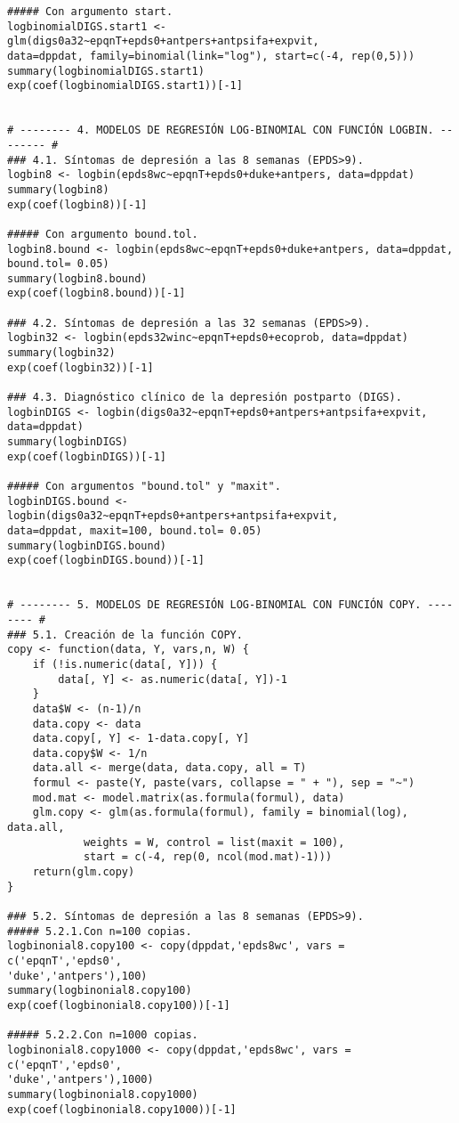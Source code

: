 \begin{Verbatim}
##### Con argumento start.
logbinomialDIGS.start1 <- glm(digs0a32~epqnT+epds0+antpers+antpsifa+expvit, 
data=dppdat, family=binomial(link="log"), start=c(-4, rep(0,5)))
summary(logbinomialDIGS.start1)
exp(coef(logbinomialDIGS.start1))[-1]


# -------- 4. MODELOS DE REGRESIÓN LOG-BINOMIAL CON FUNCIÓN LOGBIN. -------- #
### 4.1. Síntomas de depresión a las 8 semanas (EPDS>9).
logbin8 <- logbin(epds8wc~epqnT+epds0+duke+antpers, data=dppdat)
summary(logbin8)
exp(coef(logbin8))[-1]

##### Con argumento bound.tol.
logbin8.bound <- logbin(epds8wc~epqnT+epds0+duke+antpers, data=dppdat, 
bound.tol= 0.05)
summary(logbin8.bound)
exp(coef(logbin8.bound))[-1]

### 4.2. Síntomas de depresión a las 32 semanas (EPDS>9).
logbin32 <- logbin(epds32winc~epqnT+epds0+ecoprob, data=dppdat)
summary(logbin32)
exp(coef(logbin32))[-1]

### 4.3. Diagnóstico clínico de la depresión postparto (DIGS).
logbinDIGS <- logbin(digs0a32~epqnT+epds0+antpers+antpsifa+expvit, data=dppdat)
summary(logbinDIGS)
exp(coef(logbinDIGS))[-1]

##### Con argumentos "bound.tol" y "maxit".
logbinDIGS.bound <- logbin(digs0a32~epqnT+epds0+antpers+antpsifa+expvit, 
data=dppdat, maxit=100, bound.tol= 0.05)
summary(logbinDIGS.bound)
exp(coef(logbinDIGS.bound))[-1]


# -------- 5. MODELOS DE REGRESIÓN LOG-BINOMIAL CON FUNCIÓN COPY. -------- #
### 5.1. Creación de la función COPY.
copy <- function(data, Y, vars,n, W) {
	if (!is.numeric(data[, Y])) {
		data[, Y] <- as.numeric(data[, Y])-1
	}
	data$W <- (n-1)/n
	data.copy <- data
	data.copy[, Y] <- 1-data.copy[, Y]
	data.copy$W <- 1/n
	data.all <- merge(data, data.copy, all = T)
	formul <- paste(Y, paste(vars, collapse = " + "), sep = "~")
	mod.mat <- model.matrix(as.formula(formul), data)
	glm.copy <- glm(as.formula(formul), family = binomial(log), data.all,
		    weights = W, control = list(maxit = 100),
		    start = c(-4, rep(0, ncol(mod.mat)-1)))
	return(glm.copy)
}

### 5.2. Síntomas de depresión a las 8 semanas (EPDS>9).
##### 5.2.1.Con n=100 copias.
logbinonial8.copy100 <- copy(dppdat,'epds8wc', vars = c('epqnT','epds0',
'duke','antpers'),100)
summary(logbinonial8.copy100)
exp(coef(logbinonial8.copy100))[-1]

##### 5.2.2.Con n=1000 copias.
logbinonial8.copy1000 <- copy(dppdat,'epds8wc', vars = c('epqnT','epds0',
'duke','antpers'),1000)
summary(logbinonial8.copy1000)
exp(coef(logbinonial8.copy1000))[-1]


\end{Verbatim}
